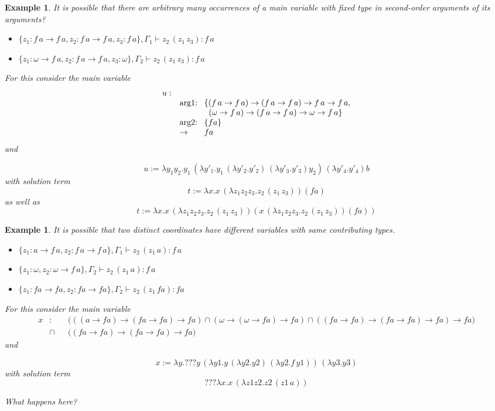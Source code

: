 \documentclass[10pt,a4paper]{article}
\theoremstyle{plain}%
\newtheorem{example}[theorem]{Example}
\begin{document}
\begin{example}
It is possible that there are arbitrary many occurrences of a main variable with fixed type in second-order arguments of its arguments?
\begin{itemize}
\item $\{z_1 : f\,a \to f\,a, z_2 : f\,a \to f\,a, z_3 : f\,a \}, \Gamma_1 \vdash z_2\,(z_1\,z_3) : f\,a$
\item $\{z_1 : \omega\to f\,a , z_2 : f\,a \to f\,a, z_3 : \omega\}, \Gamma_2 \vdash z_2\,(z_1\,z_3) : f\,a$
\end{itemize}


For this consider the main variable
\[
  \begin{array}{lp{20pt}l}
    u : & \\ &
       arg1: & \{
               (f\,a \to f\,a)\to (f\,a \to f\,a) \to f\,a \to f\,a,\\ & & \;\;
               (\omega \to f\,a)\to (f\,a \to f\,a) \to \omega \to f\,a

                       \} \\ & 
       arg2: & \{ fa \} \\ &
      $\to$   &fa
  \end{array}
\]
and

\[u := \lambda y_1y_2. y_1\,(\lambda y'_1. y_1\,(\lambda y'_2.y'_2)\,(\lambda y'_3.y'_3)y_2)\,(\lambda y'_4.y'_4)b\]
with solution term
\[t := \lambda x.x\,(\lambda z_1 z_2 z_3.z_2\,(z_1\,z_3)) (fa)\]
as well as
\[t := \lambda x.x\,(\lambda z_1 z_2 z_3.z_2\,(z_1\,z_3)) (x\,(\lambda z_1 z_2 z_3.z_2\,(z_1\,z_3)) (fa))\]

\end{example}



\begin{example}
It is possible that two distinct coordinates have different variables with same contributing types.
\begin{itemize}
\item $\{z_1 : a \to f\,a, z_2 : f\,a \to f\,a\}, \Gamma_1 \vdash z_2\,(z_1\,a) : f\,a$
\item $\{z_1 : \omega , z_2 : \omega \to f\,a\}, \Gamma_2 \vdash z_2\,(z_1\,a) : f\,a$
\item $\{z_1 : fa \to fa , z_2 :  fa \to fa\}, \Gamma_2 \vdash z_2\,(z_1\,fa) : fa$
\end{itemize}


For this consider the main variable
\begin{align*}
x &:&& \Big(((a \to fa) \to (fa \to fa) \to fa) \cap (\omega \to (\omega \to fa) \to fa) \cap ((fa \to fa) \to (fa \to fa) \to fa) \to fa\Big) \\
&\cap&& \Big((fa \to fa) \to (fa \to fa) \to fa\Big)
\end{align*}
and

\[x := \lambda y. ??? y\,(\lambda y1. y\,(\lambda y2.y2)\,(\lambda y2.f\,y1))\,(\lambda y3.y3)\]
with solution term
\[???\lambda x.x\,(\lambda z1 z2.z2\,(z1\,a))\]

{\color{red}What happens here?}
\end{example}
\end{document}
